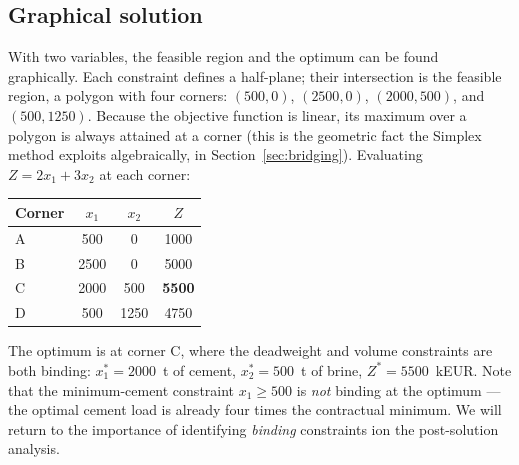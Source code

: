 \subsection{Graphical solution}

With two variables, the feasible region and the optimum can be found
graphically. Each constraint defines a half-plane; their intersection is
the feasible region, a polygon with four corners: $(500,0)$, $(2500,0)$,
$(2000,500)$, and $(500,1250)$. Because the objective function is linear,
its maximum over a polygon is always attained at a corner (this is the
geometric fact the Simplex method exploits algebraically, in
Section~\ref{sec:bridging}). Evaluating $Z = 2x_1+3x_2$ at each corner:

\begin{center}
\begin{tabular}{@{}lccc@{}}
\toprule
Corner & $x_1$ & $x_2$ & $Z$ \\
\midrule
A & 500 & 0 & 1000 \\
B & 2500 & 0 & 5000 \\
C & 2000 & 500 & \textbf{5500} \\
D & 500 & 1250 & 4750 \\
\bottomrule
\end{tabular}
\end{center}

\noindent The optimum is at corner C, where the deadweight and volume
constraints are both binding: $x_1^\ast = 2000$~t of cement, $x_2^\ast =
500$~t of brine, $Z^\ast = 5500$~kEUR. Note that the minimum-cement
constraint $x_1 \geq 500$ is \emph{not} binding at the optimum — the
optimal cement load is already four times the contractual minimum. We will return to the importance of identifying \textit{binding} constraints ion the post-solution analysis.

